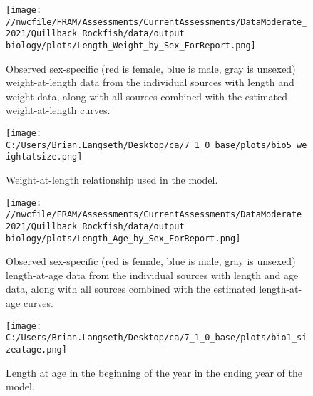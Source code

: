\documentclass[11pt,
  english,
  a4paper,
]{article}
\begin{document}
\begin{figure}
\centering
\texttt{[image: //nwcfile/FRAM/Assessments/CurrentAssessments/DataModerate\_2021/Quillback\_Rockfish/data/output biology/plots/Length\_Weight\_by\_Sex\_ForReport.png]}
\caption{Observed sex-specific (red is female, blue is male, gray is unsexed) weight-at-length data from the individual sources with length and weight data, along with all sources combined with the estimated weight-at-length curves.\label{fig:len-weight-survey}}
\end{figure}

\tagmcend\tagstructend


\begin{figure}
\centering
\texttt{[image: C:/Users/Brian.Langseth/Desktop/ca/7\_1\_0\_base/plots/bio5\_weightatsize.png]}
\caption{Weight-at-length relationship used in the model.\label{fig:len-weight}}
\end{figure}

\tagmcend\tagstructend


\begin{figure}
\centering
\texttt{[image: //nwcfile/FRAM/Assessments/CurrentAssessments/DataModerate\_2021/Quillback\_Rockfish/data/output biology/plots/Length\_Age\_by\_Sex\_ForReport.png]}
\caption{Observed sex-specific (red is female, blue is male, gray is unsexed) length-at-age data from the individual sources with length and age data, along with all sources combined with the estimated length-at-age curves.\label{fig:len-age-data}}
\end{figure}

\tagmcend\tagstructend


\begin{figure}
\centering
\texttt{[image: C:/Users/Brian.Langseth/Desktop/ca/7\_1\_0\_base/plots/bio1\_sizeatage.png]}
\caption{Length at age in the beginning of the year in the ending year of the model.\label{fig:len-age-ss}}
\end{figure}
\end{document}
